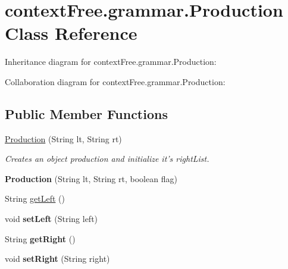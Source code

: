 \hypertarget{classcontext_free_1_1grammar_1_1_production}{\section{context\-Free.\-grammar.\-Production Class Reference}
\label{classcontext_free_1_1grammar_1_1_production}
}


Inheritance diagram for context\-Free.\-grammar.\-Production\-:


Collaboration diagram for context\-Free.\-grammar.\-Production\-:
\subsection*{Public Member Functions}
\begin{DoxyCompactItemize}
\item 
\hyperlink{classcontext_free_1_1grammar_1_1_production_a1db3c4e260abdcac50a8425cc9bd901f}{Production} (String lt, String rt)
\begin{DoxyCompactList}\small\item\em Creates an object production and initialize it's right\-List. \end{DoxyCompactList}\item 
\hypertarget{classcontext_free_1_1grammar_1_1_production_abc6df7181791245b8c3bf38871bc38b8}{{\bfseries Production} (String lt, String rt, boolean flag)}\label{classcontext_free_1_1grammar_1_1_production_abc6df7181791245b8c3bf38871bc38b8}

\item 
String \hyperlink{classcontext_free_1_1grammar_1_1_production_a6b42819c4b8af1aa759edf3ad5978f67}{get\-Left} ()
\item 
\hypertarget{classcontext_free_1_1grammar_1_1_production_a6a9e81d7a3445993afd077cfc4d21a12}{void {\bfseries set\-Left} (String left)}\label{classcontext_free_1_1grammar_1_1_production_a6a9e81d7a3445993afd077cfc4d21a12}

\item 
\hypertarget{classcontext_free_1_1grammar_1_1_production_a0b6496bc60eefe88fd4652a6f01ec15e}{String {\bfseries get\-Right} ()}\label{classcontext_free_1_1grammar_1_1_production_a0b6496bc60eefe88fd4652a6f01ec15e}

\item 
\hypertarget{classcontext_free_1_1grammar_1_1_production_aa36b86719aaccecb3c90a492c0d766e3}{void {\bfseries set\-Right} (String right)}\label{classcontext_free_1_1grammar_1_1_production_aa36b86719aaccecb3c90a492c0d766e3}


\end{DoxyCompactItemize}
